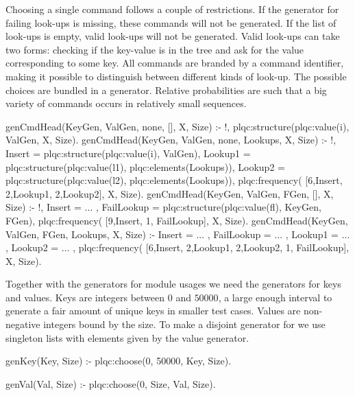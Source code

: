 Choosing a single command follows a couple of restrictions.
%
If the generator for failing look-ups is missing, these commands will
not be generated.
%
If the list of look-ups is empty, valid look-ups will not be generated.
%
Valid look-ups can take two forms: checking if the key-value is in the
tree and ask for the value corresponding to some key.
%
All commands are branded by a command identifier, making it possible to
distinguish between different kinds of look-up.
%
The possible choices are bundled in a  generator.
%
Relative probabilities are such that a big variety of commands occurs in
relatively small sequences.
%
\begin{yapcode}
 genCmdHead(KeyGen, ValGen, none,
           [], X, Size) :- !,
   plqc:structure({plqc:value(i), ValGen},
                  X, Size).
 genCmdHead(KeyGen, ValGen, none,
            Lookups, X, Size) :- !,
   Insert =
     plqc:structure({plqc:value(i),
                     ValGen}),
   Lookup1 =
     plqc:structure({plqc:value(l1),
                     plqc:elements(Lookups)}),
   Lookup2 =
     plqc:structure({plqc:value(l2),
                     plqc:elements(Lookups)}),
   plqc:frequency(
     [{6,Insert}, {2,Lookup1}, {2,Lookup2}],
     X, Size).
 genCmdHead(KeyGen, ValGen, FGen,
            [], X, Size) :- !,
   Insert = ... ,
   FailLookup =
     plqc:structure({plqc:value(fl),
                     {KeyGen, FGen}}),
   plqc:frequency(
     [{9,Insert}, {1, FailLookup}],
     X, Size).
 genCmdHead(KeyGen, ValGen, FGen,
            Lookups, X, Size) :-
   Insert = ... ,
   FailLookup = ... ,
   Lookup1 = ... ,
   Lookup2 = ... ,
   plqc:frequency(
     [{6,Insert}, {2,Lookup1},
       {2,Lookup2}, {1, FailLookup}],
     X, Size).
\end{yapcode}


Together with the generators for module usages we need the generators
for keys and values.
%
Keys are integers between $0$ and $50000$, a large enough interval to
generate a fair amount of unique keys in smaller test cases.
%
Values are non-negative integers bound by the size.
%
To make a disjoint generator for we use singleton lists with elements
given by the value generator.
\begin{yapcode}
 genKey(Key, Size) :-
   plqc:choose(0, 50000, Key, Size).

 genVal(Val, Size) :-
   plqc:choose(0, Size, Val, Size).
\end{yapcode}


